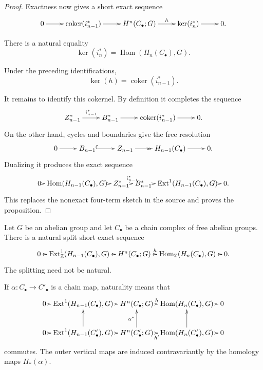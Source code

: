 \begin{proof}
\noindent
Exactness now gives a short exact sequence
$$
\xymatrix{
0 \ar[r]
  & \operatorname{coker}(i_{n-1}^*)
    \ar[r]
  & H^n(C_\bullet;G) \ar[r]^-h
  & \ker(i_n^*) \ar[r]
  & 0.
}
$$

\begin{lemma}[Claim]
\label{at-lemma-uct-kernel-hom}
There is a natural equality
$$
\ker(i_n^*)
=
\operatorname{Hom}(H_n(C_\bullet),G).
$$
\end{lemma}

\begin{lemma}[Claim]
\label{at-lemma-uct-kernel-cokernel}
Under the preceding identifications,
$$
\ker(h)=\operatorname{coker}(i_{n-1}^*).
$$
\end{lemma}

\noindent
It remains to identify this cokernel.  By
definition it completes the sequence
$$
\xymatrix{
Z_{n-1}^* \ar[r]^-{i_{n-1}^*}
  & B_{n-1}^* \ar[r]
  & \operatorname{coker}(i_{n-1}^*)
    \ar[r]
  & 0.
}
$$
On the other hand, cycles and boundaries
give the free resolution
$$
\xymatrix{
0 \ar[r]
  & B_{n-1} \ar@{^{(}->}[r]
  & Z_{n-1} \ar@{->>}[r]
  & H_{n-1}(C_\bullet) \ar[r]
  & 0.
}
$$
Dualizing it produces the exact sequence
{\small
$$
\xymatrix@C=.2em{
0 \ar[r]
  & \operatorname{Hom}
    (H_{n-1}(C_\bullet),G)
  \ar[r]
  & Z_{n-1}^* \ar[r]^-{i_{n-1}^*}
  & B_{n-1}^* \ar[r]
  & \operatorname{Ext}^1
    (H_{n-1}(C_\bullet),G)
  \ar[r]
  & 0.
}
$$
}
This replaces the nonexact four-term sketch
in the source and proves the proposition.
\end{proof}

\begin{theorem}
\label{at-theorem-universal-coefficients}
Let $G$ be an abelian group and let
$C_\bullet$ be a chain complex of free
abelian groups.  There is a natural split
short exact sequence
$$
\xymatrix@C=.55em{
0 \ar[r]
  & \operatorname{Ext}^1_{
    \mathbb{Z}}(H_{n-1}(C_\bullet),G)
    \ar[r]
  & H^n(C_\bullet;G) \ar[r]^-h
  & \operatorname{Hom}_{\mathbb{Z}}
    (H_n(C_\bullet),G)
    \ar[r]
  & 0.
}
$$
The splitting need not be natural.

If $\alpha:C_\bullet\to C'_\bullet$ is a
chain map, naturality means that
$$
\xymatrix@C=.35em@R=2.3em{
0 \ar[r]
  & \operatorname{Ext}^1
    (H_{n-1}(C_\bullet),G)
    \ar[r]
  & H^n(C_\bullet;G) \ar[r]^-h
  & \operatorname{Hom}
    (H_n(C_\bullet),G)
    \ar[r]
  & 0 \\
0 \ar[r]
  & \operatorname{Ext}^1
    (H_{n-1}(C'_\bullet),G)
    \ar[r] \ar[u]
  & H^n(C'_\bullet;G)
    \ar[r]_-{h'} \ar[u]^{\alpha^*}
  & \operatorname{Hom}
    (H_n(C'_\bullet),G)
    \ar[r] \ar[u]
  & 0
}
$$
commutes.  The outer vertical maps are
induced contravariantly by the homology maps
$H_*(\alpha)$.
\end{theorem}

